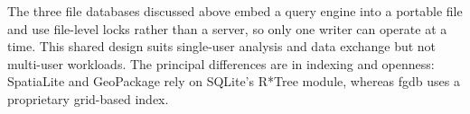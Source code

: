 The three file databases discussed above embed a query engine into a portable file and use file-level locks rather than a server, so only one writer can operate at a time. This shared design suits single-user analysis and data exchange but not multi-user workloads. The principal differences are in indexing and openness: SpatiaLite and GeoPackage rely on SQLite's R*Tree module, whereas \acrshort{fgdb} uses a proprietary grid-based index.


